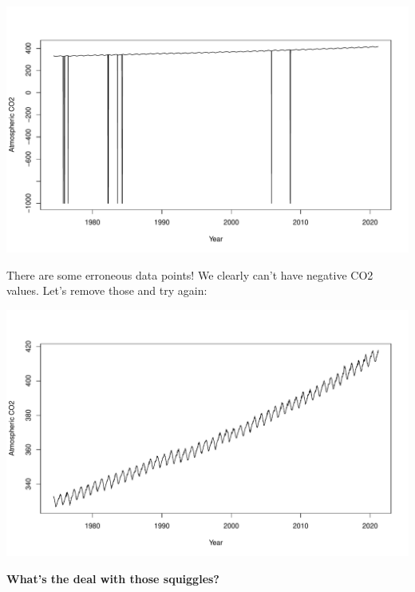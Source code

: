 \documentclass[
]{book}
\newenvironment{Shaded}{\begin{snugshade}}{\end{snugshade}}
\newcommand{\DataTypeTok}[1]{\textcolor[rgb]{0.13,0.29,0.53}{#1}}
\newcommand{\DecValTok}[1]{\textcolor[rgb]{0.00,0.00,0.81}{#1}}
\newcommand{\KeywordTok}[1]{\textcolor[rgb]{0.13,0.29,0.53}{\textbf{#1}}}
\newcommand{\NormalTok}[1]{#1}
\newcommand{\OperatorTok}[1]{\textcolor[rgb]{0.81,0.36,0.00}{\textbf{#1}}}
\newcommand{\StringTok}[1]{\textcolor[rgb]{0.31,0.60,0.02}{#1}}
\begin{document}
\includegraphics{figures/unnamed-chunk-234-1.pdf}

There are some erroneous data points! We clearly can't have negative CO2 values. Let's remove those and try again:

\begin{Shaded}
\end{Shaded}

\includegraphics{figures/unnamed-chunk-235-1.pdf}

\textbf{What's the deal with those squiggles?}
\end{document}
